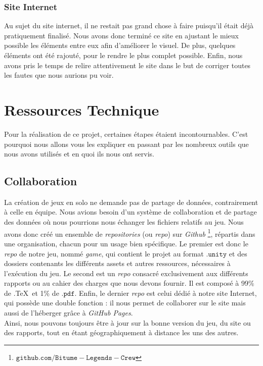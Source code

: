 \documentclass[a4paper,12pt]{article}
\begin{document}
            \subsubsection{Site Internet}
            Au sujet du site internet, il ne restait pas grand chose à faire puisqu'il était déjà pratiquement finalisé. Nous avons donc terminé ce site en ajustant le mieux possible les éléments entre eux afin d'améliorer le visuel. De plus, quelques éléments ont été rajouté, pour le rendre le plus complet possible. Enfin, nous avons pris le temps de relire attentivement le site dans le but de corriger toutes les fautes que nous aurions pu voir.


    \clearpage
    \section{Ressources Technique}
    Pour la réalisation de ce projet, certaines étapes étaient incontournables. C'est pourquoi nous allons vous les expliquer en passant par les nombreux outils que nous avons utilisés et en quoi ils nous ont servis.
        \subsection{Collaboration}
            La création de jeux en solo ne demande pas de partage de données, contrairement 
            à celle en équipe. Nous avions besoin d'un système de collaboration et de partage des données où nous 
            pourrions nous échanger les fichiers relatifs au jeu. 
            Nous avons donc créé un ensemble de \textit{repositories} (ou \textit{repo}) sur \textsl{Github}
            \footnote{\(\mathtt{github.com/Bitume-Legends-Crew}\)}, répartis dans une organisation,
            chacun pour un usage bien spécifique. Le premier est donc le \textit{repo} de
            notre jeu, nommé \textit{game}, qui contient le projet au format \(\mathtt{.unity}\)
            et des dossiers contenants les différents assets et autres ressources,
            nécessaires à l'exécution du jeu. 
            Le second est un \textit{repo} consacré exclusivement aux différents rapports ou au cahier des charges
            que nous devons fournir. Il est composé à 99\% de .\TeX\, et 1\% de \(\mathtt{.pdf}\).
            Enfin, le dernier \textit{repo} est celui dédié à notre site Internet, qui
            possède une double fonction : il nous permet de collaborer sur le site
            mais aussi de l'héberger grâce à \textsl{GitHub Pages}.\\
            \indent Ainsi, nous pouvons toujours être à jour sur la bonne version du jeu,
            du site ou des rapports, tout en étant géographiquement à distance les uns 
            des autres.
\end{document}
